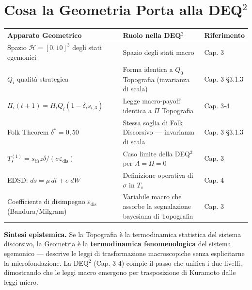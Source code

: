 \section{Cosa la Geometria Porta alla
DEQ$^2$}\label{cosa-la-geometria-porta-alla-dequxb2}

{\def\LTcaptype{none} %
{\small\begin{longtable}[]{@{}
  >{\raggedright\arraybackslash}p{}
  >{\raggedright\arraybackslash}p{}
  >{\raggedright\arraybackslash}p{}@{}}
\toprule\noalign{}
\begin{minipage}[b]{\linewidth}\raggedright
Apparato Geometrico
\end{minipage} & \begin{minipage}[b]{\linewidth}\raggedright
Ruolo nella DEQ$^2$
\end{minipage} & \begin{minipage}[b]{\linewidth}\raggedright
Riferimento
\end{minipage} \\
\midrule\noalign{}
\endhead
\bottomrule\noalign{}
\endlastfoot
Spazio \(\mathcal{H} = [0,10]^3\) degli stati egemonici & Spazio degli
stati macro & Cap. 3 \\
\(Q_i\) qualità strategica & Forma identica a \(Q_0\) Topografia
(invarianza di scala) & Cap. 3 \S{}3.1.3 \\
\(\Pi_i(t+1) = H_i Q_i (1 - \delta_i s_{i,3})\) & Legge macro-payoff
identica a $\Pi$ Topografia & Cap. 3-4 \\
Folk Theorem \(\delta^* = 0{,}50\) & Stessa soglia di Folk Discorsivo
--- invarianza di scala & Cap. 3 \S{}3.1.3 \\
\(T_s^{(1)} = s_{iii} z \delta / (\sigma \varepsilon_{\text{dis}})\) &
Caso limite della DEQ$^2$ per \(A = \Omega = 0\) & Cap. 3 \\
EDSD: \(ds = \mu\, dt + \sigma\, dW\) & Definizione operativa di
\(\sigma\) in \(T_s\) & Cap. 4 \\
Coefficiente di disimpegno \(\varepsilon_{\text{dis}}\)
(Bandura/Milgram) & Variabile macro che assorbe la segnalazione
bayesiana di Topografia & Cap. 3 \\
\end{longtable}}
}

\Hypoth{} \textbf{Sintesi epistemica.} Se la Topografia è la
termodinamica statistica del sistema discorsivo, la Geometria è la
\textbf{termodinamica fenomenologica} del sistema egemonico --- descrive
le leggi di trasformazione macroscopiche senza esplicitarne la
microfondazione. La DEQ$^2$ (Cap. 3-4) compie il passo che unifica i due
livelli, dimostrando che le leggi macro emergono per trasposizione di
Kuramoto dalle leggi micro.



